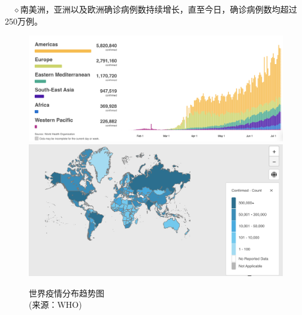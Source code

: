 \documentclass[
]{article}
\begin{document}
\(\quad\)\(\diamond\)南美洲，亚洲以及欧洲确诊病例数持续增长，直至今日，确诊病例数均超过250万例。

\begin{figure}[H]
\caption{世界疫情分布趋势图\\ \vspace{-3mm}(来源：WHO)} %
\centering
\includegraphics[]{./input/covid1.png} %
\includegraphics[]{./input/covid4.png}
\label{} %
\end{figure}
\end{document}
